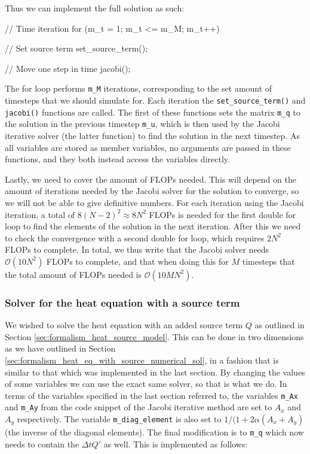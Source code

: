 \documentclass[reprint,english,notitlepage]{revtex4-1}  %
\begin{document}
Thus we can implement the full solution as such:

\begin{cpp}
// Time iteration
for (m_t = 1; m_t <= m_M; m_t++){
  // Set source term
  set_source_term();

  // Move one step in time
  jacobi();
}
\end{cpp}

The for loop performs \verb+m_M+ iterations, corresponding to the set amount of timesteps that we should simulate for. Each iteration the \verb+set_source_term()+ and \verb+jacobi()+ functions are called. The first of these functions sets the matrix \verb+m_q+ to the solution in the previous timestep \verb+m_u+, which is then used by the Jacobi iterative solver (the latter function) to find the solution in the next timestep. As all variables are stored as member variables, no arguments are passed in these functions, and they both instead access the variables directly. 

Lastly, we need to cover the amount of FLOPs needed. This will depend on the amount of iterations needed by the Jacobi solver for the solution to converge, so we will not be able to give definitive numbers. For each iteration using the Jacobi iteration, a total of $8(N-2)^2 \approx 8N^2$ FLOPs is needed for the first double for loop to find the elements of the solution in the next iteration. After this we need to check the convergence with a second double for loop, which requires $2N^2$ FLOPs to complete. In total, we thus write that the Jacobi solver needs $\mathcal{O}(10N^2)$ FLOPs to complete, and that when doing this for $M$ timesteps that the total amount of FLOPs needed is $\mathcal{O}(10MN^2)$. 

\subsubsection{Solver for the heat equation with a source term} \label{sec:method_heat_solver}

We wished to solve the heat equation with an added source term $Q$ as outlined in Section \ref{sec:formalism_heat_source_model}. This can be done in two dimensions as we have outlined in Section \ref{sec:formalism_heat_eq_with_source_numerical_sol}, in a fashion that is similar to that which was implemented in the last section. By changing the values of some variables we can use the exact same solver, so that is what we do. In terms of the variables specified in the last section referred to, the variables \verb+m_Ax+ and \verb+m_Ay+ from the code snippet of the Jacobi iterative method are set to $A_x$ and $A_y$ respectively. The variable \verb+m_diag_element+ is also set to $1/(1+ 2\alpha(A_x + A_y)$ (the inverse of the diagonal elements). The final modification is to \verb+m_q+ which now needs to contain the $\Delta t Q'$ as well. This is implemented as follows:
\end{document}

